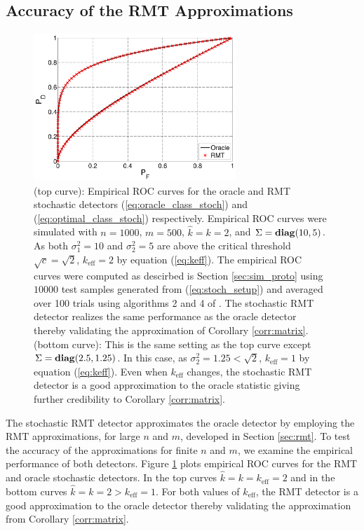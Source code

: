 \subsection{Accuracy of the RMT Approximations}
\begin{figure}
\centering
\includegraphics[width=3in]{figures/oracle_rmt.pdf}
\caption{(top curve): Empirical ROC curves for the oracle and RMT stochastic detectors (\ref{eq:oracle_class_stoch}) and (\ref{eq:optimal_class_stoch}) respectively. Empirical ROC curves were simulated with $n=1000$, $m=500$, $\widehat{k}=k=2$, and $\Sigma=\mathop{\bf diag}(10,5)$. As both $\sigma_1^2=10$ and $\sigma_2^2=5$ are above the critical threshold $\sqrt{c}=\sqrt{2}$, $k_{\text{eff}} = 2$ by equation (\ref{eq:keff}). The empirical ROC curves were computed as descirbed is Section \ref{sec:sim_proto} using $10000$ test samples generated from (\ref{eq:stoch_setup}) and averaged over 100 trials using algorithms 2 and 4 of \cite{fawcett2006introduction}. The stochastic RMT detector realizes the same performance as the oracle detector thereby validating the approximation of Corollary \ref{corr:matrix}. (bottom curve): This is the same setting as the top curve except $\Sigma = \mathop{\bf diag}(2.5, 1.25)$. In this case, as $\sigma_2^2=1.25< \sqrt{2}$, $k_{\text{eff}} = 1$ by equation (\ref{eq:keff}). Even when $k_\text{eff}$ changes, the stochastic RMT detector is a good approximation to the oracle statistic giving further credibility to Corollary \ref{corr:matrix}.}
\label{fig:oracle_rmt}
\end{figure}

The stochastic RMT detector approximates the oracle detector by employing the RMT approximations, for large $n$ and $m$, developed in Section \ref{sec:rmt}. To test the accuracy of the approximations for finite $n$ and $m$, we examine the empirical performance of both detectors. Figure \ref{fig:oracle_rmt} plots empirical ROC curves for the RMT and oracle stochastic detectors. In the top curves $\widehat{k}=k=k_\text{eff}=2$ and in the bottom curves $\widehat{k}=k=2 > k_\text{eff}=1$. For both values of $k_\text{eff}$, the RMT detector is a good approximation to the oracle detector thereby validating the approximation from Corollary \ref{corr:matrix}.


